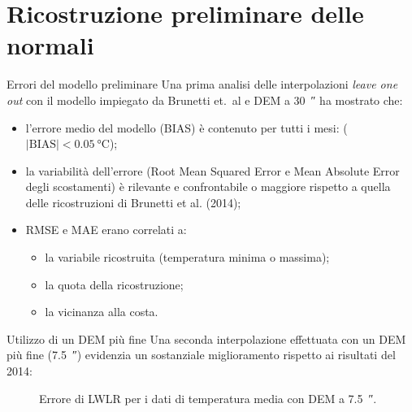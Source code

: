 
\section{Ricostruzione preliminare delle normali}
\begin{frame}[t]{Errori del modello preliminare}
  Una prima analisi delle interpolazioni \emph{leave one out} con il modello impiegato da Brunetti et.\ al e DEM a \qty{30}{\arcsecond} ha mostrato che:
  \begin{itemize}
    \item l'errore medio del modello (BIAS) è contenuto per tutti i mesi: (\(\lvert \mathrm{BIAS} \rvert < \qty{0.05}{\degreeCelsius}\));
    \item la variabilità dell'errore (Root Mean Squared Error e Mean Absolute Error degli scostamenti) è rilevante e confrontabile o maggiore rispetto a quella delle ricostruzioni di Brunetti et al. (2014);
    \item RMSE e MAE erano correlati a:
      \begin{itemize}
        \item la variabile ricostruita (temperatura minima o massima);
        \item la quota della ricostruzione;
        \item la vicinanza alla costa.
      \end{itemize}
  \end{itemize}
\end{frame}

\begin{frame}{Utilizzo di un DEM più fine}
  Una seconda interpolazione effettuata con un DEM più fine (\qty{7.5}{\arcsecond}) evidenzia un sostanziale miglioramento rispetto ai risultati del 2014:
  \begin{figure}
    
    \caption*{Errore di LWLR per i dati di temperatura media con DEM a \qty{7.5}{\arcsecond}.}
  \end{figure}
\end{frame}

%     

